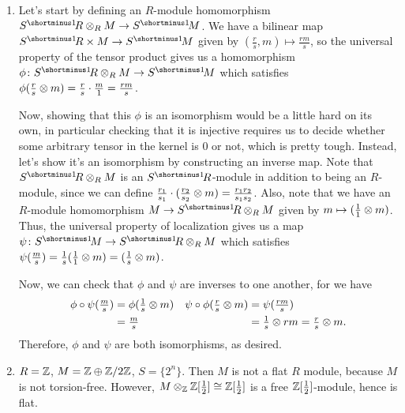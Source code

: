 \begin{solution}
\begin{enumerate}
    \item Let's start by defining an $R$-module homomorphism $S\linv R \tensor_R M \to S\linv M$. We have a bilinear map $S\linv R \times M \to S\linv M$ given by $(\tfrac{r}{s},m) \mapsto \tfrac{rm}{s}$, so the universal property of the tensor product gives us a homomorphism $\phi\colon S\linv R \tensor_R M \to S\linv M$ which satisfies $\phi(\tfrac{r}{s} \otimes m) = \tfrac{r}{s} \cdot \tfrac{m}{1} = \tfrac{rm}{s}$.

    Now, showing that this $\phi$ is an isomorphism would be a little hard on its own, in particular checking that it is injective requires us to decide whether some arbitrary tensor in the kernel is 0 or not, which is pretty tough. Instead, let's show it's an isomorphism by constructing an inverse map. Note that $S\linv R \tensor_R M$ is an $S\linv R$-module in addition to being an $R$-module, since we can define $\tfrac{r_1}{s_1} \cdot (\tfrac{r_2}{s_2} \otimes m) = \tfrac{r_1 r_2}{s_1 s_2}$. Also, note that we have an $R$-module homomorphism $M \to S\linv R \tensor_R M$ given by $m \mapsto (\tfrac{1}{1} \otimes m)$. Thus, the universal property of localization gives us a map $\psi\colon S\linv M \to S\linv R \tensor_R M$ which satisfies $\psi(\tfrac{m}{s}) = \tfrac{1}{s}(\tfrac{1}{1} \otimes m) = (\tfrac{1}{s} \otimes m)$.

    Now, we can check that $\phi$ and $\psi$ are inverses to one another, for we have
    \begin{align*}
        \phi \circ \psi(\tfrac{m}{s}) &= \phi(\tfrac{1}{s} \otimes m) & \psi \circ \phi(\tfrac{r}{s} \otimes m) &= \psi(\tfrac{rm}{s})\\
        &= \tfrac{m}{s} & &= \tfrac{1}{s} \otimes rm = \tfrac{r}{s} \otimes m.
    \end{align*}
    Therefore, $\phi$ and $\psi$ are both isomorphisms, as desired.
    \item $R = \mathbb{Z}$, $M = \mathbb{Z} \oplus \mathbb{Z}/2\mathbb{Z}$, $S = \{2^n\}$. Then $M$ is not a flat $R$ module, because $M$ is not torsion-free. However, $M \otimes_{\mathbb{Z}} \mathbb{Z}[\frac{1}{2}] \cong \mathbb{Z}[\tfrac{1}{2}]$ is a free $\mathbb{Z}[\tfrac{1}{2}]$-module, hence is flat.
\end{enumerate}
\end{solution}

